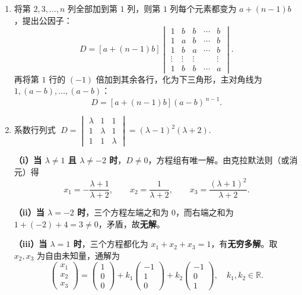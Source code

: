 \documentclass[12pt]{ctexart}
\begin{document}
\begin{enumerate}[label=\textbf{\arabic*.},itemsep=13pt]
\item 将第 $2,3,\dots,n$ 列全部加到第 $1$ 列，则第 $1$ 列每个元素都变为 $a+(n-1)b$，提出公因子：
  \[
  D=[a+(n-1)b]\begin{vmatrix}
  1 & b & b & \cdots & b\\
  1 & a & b & \cdots & b\\
  1 & b & a & \cdots & b\\
  \vdots&\vdots&\vdots& &\vdots\\
  1 & b & b & \cdots & a
  \end{vmatrix}.
  \]
  再将第 $1$ 行的 $(-1)$ 倍加到其余各行，化为下三角形，主对角线为 $1,(a-b),\dots,(a-b)$：
  \[
  \boxed{D=[a+(n-1)b](a-b)^{\,n-1}.}
  \]

\item 系数行列式
  $\;D=\begin{vmatrix}\lambda&1&1\\1&\lambda&1\\1&1&\lambda\end{vmatrix}=(\lambda-1)^{2}(\lambda+2).$

  \textbf{（i）当 $\lambda\neq1$ 且 $\lambda\neq-2$ 时}，$D\neq0$，方程组有唯一解。由克拉默法则（或消元）得
  \[
  x_1=-\frac{\lambda+1}{\lambda+2},\qquad x_2=\frac{1}{\lambda+2},\qquad x_3=\frac{(\lambda+1)^{2}}{\lambda+2}.
  \]

  \textbf{（ii）当 $\lambda=-2$ 时}，三个方程左端之和为 $0$，而右端之和为 $1+(-2)+4=3\neq0$，矛盾，故\textbf{无解}。

  \textbf{（iii）当 $\lambda=1$ 时}，三个方程都化为 $x_1+x_2+x_3=1$，有\textbf{无穷多解}。取 $x_2,x_3$ 为自由未知量，通解为
  \[
  \begin{pmatrix}x_1\\x_2\\x_3\end{pmatrix}
  =\begin{pmatrix}1\\0\\0\end{pmatrix}
  +k_1\begin{pmatrix}-1\\1\\0\end{pmatrix}
  +k_2\begin{pmatrix}-1\\0\\1\end{pmatrix},\quad k_1,k_2\in\mathbb{R}.
  \]


\end{enumerate}
\end{document}
